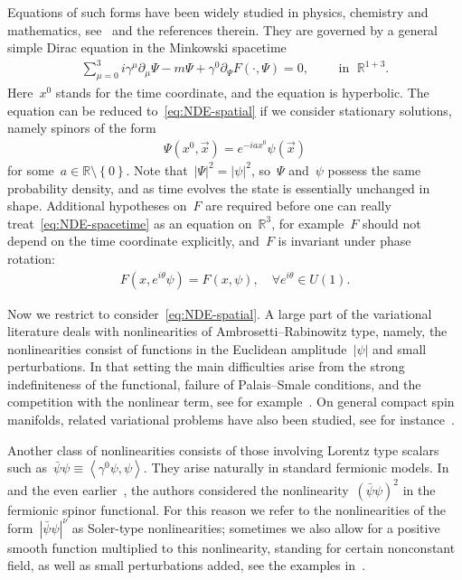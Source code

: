 \documentclass[10pt,a4paper]{amsart}
\newcommand{\p}{\partial}
\newcommand{\R}{\mathbb{R}}
\newcommand{\Abracket}[1]{\left<#1\right>} %
\newcommand{\braces}[1]{\left\{#1\right\}} %
\begin{document}
Equations of such forms have been widely studied in physics, chemistry and mathematics, see~\cite{Esteban2002overview,Ranada1983Classical,Thaller1992Dirac} and the references therein. 
They are governed by a general simple Dirac equation in the Minkowski spacetime 
\begin{align}\label{eq:NDE-spacetime}
    \sum_{\mu=0}^3 i\gamma^\mu\p_\mu \Psi - m \Psi +\gamma^0 \p_\Psi F(\cdot,\Psi)=0, \qquad \mbox{ in } \; \R^{1+3}. 
\end{align}
Here~$x^0$ stands for the time coordinate, and the equation is hyperbolic. 
The equation can be reduced to~\eqref{eq:NDE-spatial} if we consider stationary solutions, namely spinors of the form
\begin{align}\label{eq:ansatz}
    \Psi(x^0, \vec{x}) = e^{-iax^0}\psi(\vec{x})
\end{align}
for some~$a\in \R\setminus\braces{0}$. 
Note that~$|\Psi|^2=|\psi|^2$, so~$\Psi$ and~$\psi$ possess the same probability density, and as time evolves the state is essentially unchanged in shape. 
Additional hypotheses on~$F$ are required before one can really treat~\eqref{eq:NDE-spacetime} as an equation on~$\R^3$, for example~$F$ should not depend on the time coordinate explicitly, and~$F$ is invariant under phase rotation:
\begin{align}
    F(x, e^{i\theta}\psi)=F(x,\psi), \quad \forall e^{i\theta} \in U(1). 
\end{align}
 
Now we restrict to consider~\eqref{eq:NDE-spatial}.
A large part of the variational literature deals with nonlinearities of Ambrosetti--Rabinowitz type, namely, the nonlinearities consist of functions in the Euclidean amplitude~$|\psi|$ and small perturbations. 
In that setting the main difficulties arise from the strong indefiniteness of the functional, failure of Palais--Smale conditions, and the competition with the nonlinear term, see for example~\cite{BartschDing2006Solutions,DingRuf2008Solutions,YangDing2012Stationary}.
On general compact spin manifolds, related variational problems have also been studied, see for instance~\cite{Ammann2003Habil, BartschXu2021spinorial, DingLiXu2016bifurcation, DingXu2025localized, Isobe2011nonlinear, Isobe2020Morse}. 



Another class of nonlinearities consists of those involving Lorentz type scalars such as~$\bar{\psi}\psi\equiv \Abracket{\gamma^0\psi,\psi}$. 
They arise naturally in standard fermionic models.
In~\cite{Soler1970Classical} and the even earlier~\cite{Finkelstein1951Non-linea}, the authors considered the nonlinearity~$ (\bar{\psi}\psi)^2$ in the fermionic spinor functional. 
For this reason we refer to the nonlinearities of the form~$|\bar{\psi}\psi|^\nu$ as Soler-type nonlinearities; sometimes we also allow for a positive smooth function multiplied to this nonlinearity, standing for certain nonconstant field, as well as small perturbations added, see the examples in~\cite{WZ2026Stationary}. 
\end{document}
